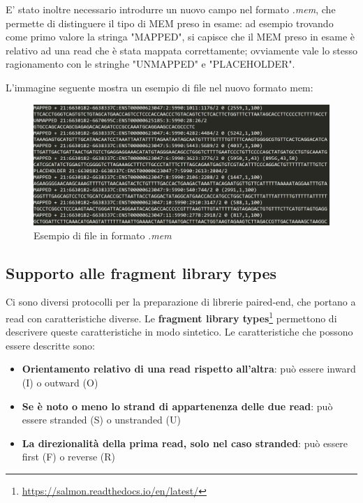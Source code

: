 E' stato inoltre necessario introdurre un nuovo campo nel formato \textit{.mem}, che permette di distinguere il tipo di MEM preso in esame: ad esempio trovando come primo valore la stringa "MAPPED", si capisce che il MEM preso in esame è relativo ad una read che è stata mappata correttamente; ovviamente vale lo stesso ragionamento con le stringhe "UNMAPPED" e "PLACEHOLDER".

L'immagine seguente mostra un esempio di file nel nuovo formato mem:

\begin{figure}[h!]
	\centering
	\includegraphics[width=\linewidth]{images/tipiMEM4.png}
  \caption{Esempio di file in formato \textit{.mem}}
  \label{fig:MEMTypes}
\end{figure}

\newpage

\subsection{Supporto alle fragment library types}
Ci sono diversi protocolli per la preparazione di librerie paired-end, che portano a read con caratteristiche diverse. Le \textbf{fragment library types}\footnote{\url{https://salmon.readthedocs.io/en/latest/}} permettono di descrivere queste caratteristiche in modo sintetico. Le caratteristiche che possono essere descritte sono:
\begin{itemize}
	\item \textbf{Orientamento relativo di una read rispetto all'altra}: può essere inward (I) o outward (O)
	\item \textbf{Se è noto o meno lo strand di appartenenza delle due read}:  può essere stranded (S) o unstranded (U)
	\item \textbf{La direzionalità della prima read, solo nel caso stranded}: può essere first (F) o reverse (R)
\end{itemize}

